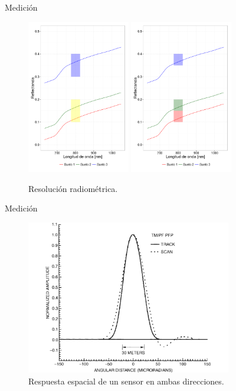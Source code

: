 \documentclass[handout]{beamer}
\begin{document}
\begin{frame}{Medici\'on}
  \begin{figure}\centering
    \includegraphics[width=0.4\textwidth]{imagenes/rbaja.png}\phantom{F}
    \includegraphics[width=0.4\textwidth]{imagenes/ralta.png}
    \caption{Resoluci\'on radiom\'etrica.}
  \end{figure}
\end{frame}

\begin{frame}{Medici\'on}
  \begin{figure}
  \centering
  \includegraphics[width=0.8\textwidth]{imagenes/respacial.png}
  \caption{Respuesta espacial de un sensor en ambas direcciones.}
  \end{figure}
\end{frame}
\end{document}
